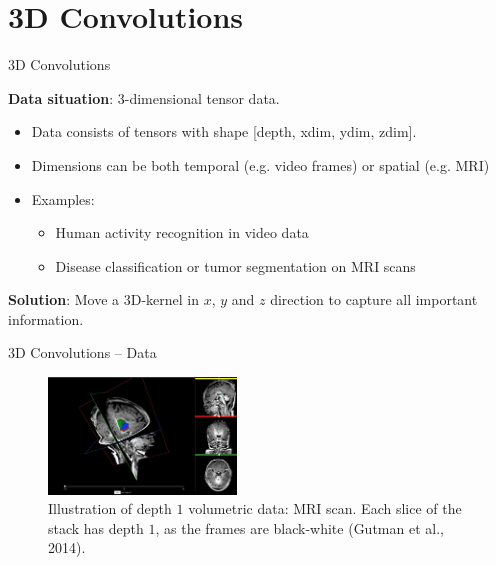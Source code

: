
\section{3D Convolutions}

\begin{vbframe}{3D Convolutions}

\textbf{Data situation}: 3-dimensional tensor data.

    \begin{itemize}
        \item Data consists of tensors with shape [depth, xdim, ydim, zdim].
        \item Dimensions can be both temporal (e.g. video frames) or spatial (e.g. MRI)
        \item Examples:
        \begin{itemize}
            \item Human activity recognition in video data
            \item Disease classification or tumor segmentation on MRI scans
        \end{itemize}
    \end{itemize}

\textbf{Solution}: Move a 3D-kernel in $x$, $y$ and $z$ direction to capture all important information.

\end{vbframe}
\begin{vbframe}{3D Convolutions -- Data}
    \begin{figure}
        \centering
        \includegraphics[width=5cm]{plots/05_conv_variations/3d/mri.jpg}
        \caption{Illustration of depth $1$ volumetric data: MRI scan. Each slice of the stack has depth $1$, as the frames are black-white (Gutman et al., 2014).}
    \end{figure}
\end{vbframe}

